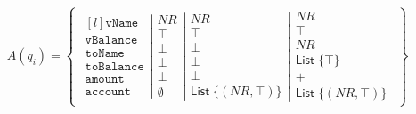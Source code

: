 \begin{align}
    A(q_i)=\left\{\begin{matrix}
                      \left.\begin{matrix*}[l]
                                \texttt{vName}\\
                                \texttt{vBalance}\\
                                \texttt{toName}\\
                                \texttt{toBalance}\\
                                \texttt{amount}\\
                                \texttt{account}
                      \end{matrix*}\right|
                      \left.\begin{matrix}
                                NR\\
                                \top\\
                                \bot\\
                                \bot\\
                                \bot\\
                                \emptyset
                      \end{matrix}\right|
                      \left.\begin{matrix}
                                NR\\
                                \top\\
                                \bot\\
                                \bot\\
                                \bot\\
                                \mathsf{List} \; \{(NR,\top)\}
                      \end{matrix}\right|
                      \begin{matrix}
                          NR\\
                          \top\\
                          NR\\
                          \mathsf{List} \; \{\top\}\\
                          +\\
                          \mathsf{List} \; \{(NR,\top)\}
                      \end{matrix}
    \end{matrix}\right\}
\end{align}

